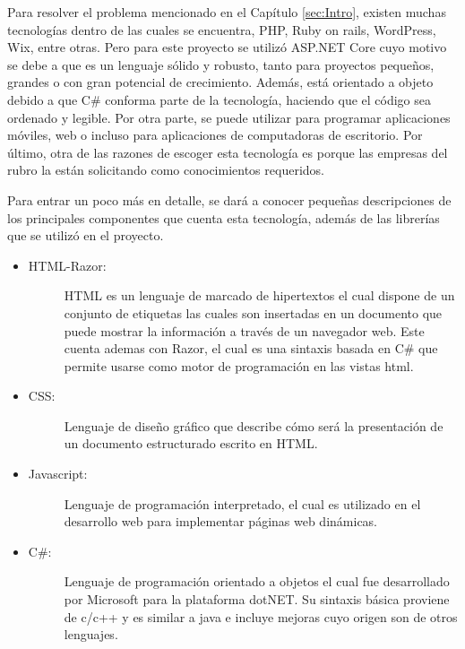 Para resolver el problema mencionado en el Capítulo \ref{sec:Intro}, existen muchas tecnologías dentro de las cuales se encuentra, PHP, Ruby on rails, WordPress, Wix, entre otras. Pero para este proyecto se utilizó ASP.NET Core cuyo motivo se debe a que es un lenguaje sólido y robusto, tanto para proyectos pequeños, grandes o con gran potencial de crecimiento. Además, está orientado a objeto debido a que C\# conforma parte de la tecnología, haciendo que el código sea ordenado y legible. Por otra parte, se puede utilizar para programar aplicaciones móviles, web o incluso para aplicaciones de computadoras de escritorio. Por último, otra de las razones de escoger esta tecnología es porque las empresas del rubro la están solicitando como conocimientos requeridos. 

Para entrar un poco más en detalle, se dará a conocer pequeñas descripciones de los principales componentes que cuenta esta tecnología, además de las librerías que se utilizó en el proyecto.

\begin{itemize}
    \item   \begin{description}
                \item[HTML-Razor:] HTML es un lenguaje de marcado de hipertextos el cual dispone de un conjunto de etiquetas las cuales son insertadas en un documento que puede mostrar la información a través de un navegador web. Este cuenta ademas con Razor, el cual es una sintaxis basada en C\# que permite usarse como motor de programación en las vistas html. 
            \end{description}

    \item   \begin{description}
                \item[CSS:] Lenguaje de diseño gráfico que describe cómo será la presentación de un documento estructurado escrito en HTML. 
            \end{description}

    \item   \begin{description}
                \item[Javascript:] Lenguaje de programación interpretado, el cual es utilizado en el desarrollo web para implementar páginas web dinámicas.
            \end{description}

    \item   \begin{description}
                \item[C\#:] Lenguaje de programación orientado a objetos el cual fue desarrollado por Microsoft para la plataforma dotNET. Su sintaxis básica proviene de c/c++ y es similar a java e incluye mejoras cuyo origen son de otros lenguajes.
            \end{description}
    
\end{itemize}

